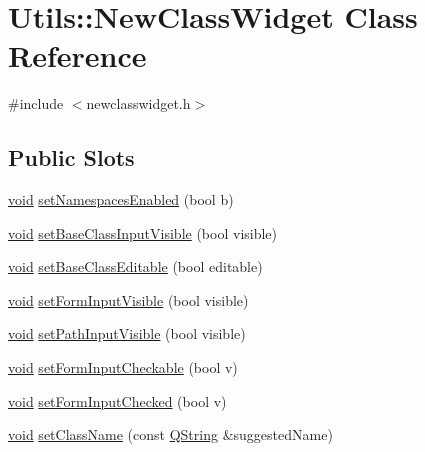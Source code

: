 \hypertarget{class_utils_1_1_new_class_widget}{\section{\-Utils\-:\-:\-New\-Class\-Widget \-Class \-Reference}
\label{class_utils_1_1_new_class_widget}
}


{\ttfamily \#include $<$newclasswidget.\-h$>$}

\subsection*{\-Public \-Slots}
\begin{DoxyCompactItemize}
\item 
\hyperlink{group___u_a_v_objects_plugin_ga444cf2ff3f0ecbe028adce838d373f5c}{void} \hyperlink{class_utils_1_1_new_class_widget_a5c89fb1e9a2f9e8816579e26d01b5bc2}{set\-Namespaces\-Enabled} (bool b)
\item 
\hyperlink{group___u_a_v_objects_plugin_ga444cf2ff3f0ecbe028adce838d373f5c}{void} \hyperlink{class_utils_1_1_new_class_widget_aaaf28bf82d98ad50f6232ee76fbaa285}{set\-Base\-Class\-Input\-Visible} (bool visible)
\item 
\hyperlink{group___u_a_v_objects_plugin_ga444cf2ff3f0ecbe028adce838d373f5c}{void} \hyperlink{class_utils_1_1_new_class_widget_ac2276990adb49b7b81eb2d22a202b246}{set\-Base\-Class\-Editable} (bool editable)
\item 
\hyperlink{group___u_a_v_objects_plugin_ga444cf2ff3f0ecbe028adce838d373f5c}{void} \hyperlink{class_utils_1_1_new_class_widget_aef1b140a9e382e7e540a8572e3699bef}{set\-Form\-Input\-Visible} (bool visible)
\item 
\hyperlink{group___u_a_v_objects_plugin_ga444cf2ff3f0ecbe028adce838d373f5c}{void} \hyperlink{class_utils_1_1_new_class_widget_a074da3c815cded546c6725519d60d710}{set\-Path\-Input\-Visible} (bool visible)
\item 
\hyperlink{group___u_a_v_objects_plugin_ga444cf2ff3f0ecbe028adce838d373f5c}{void} \hyperlink{class_utils_1_1_new_class_widget_a5b42419017941a3fb8927c408ac899da}{set\-Form\-Input\-Checkable} (bool v)
\item 
\hyperlink{group___u_a_v_objects_plugin_ga444cf2ff3f0ecbe028adce838d373f5c}{void} \hyperlink{class_utils_1_1_new_class_widget_af61268ef168692b168778e9b5dc44220}{set\-Form\-Input\-Checked} (bool v)
\item 
\hyperlink{group___u_a_v_objects_plugin_ga444cf2ff3f0ecbe028adce838d373f5c}{void} \hyperlink{class_utils_1_1_new_class_widget_ac83a1c443d3c883fd63cb8869617b6bc}{set\-Class\-Name} (const \hyperlink{group___u_a_v_objects_plugin_gab9d252f49c333c94a72f97ce3105a32d}{\-Q\-String} \&suggested\-Name)

\end{DoxyCompactItemize}
